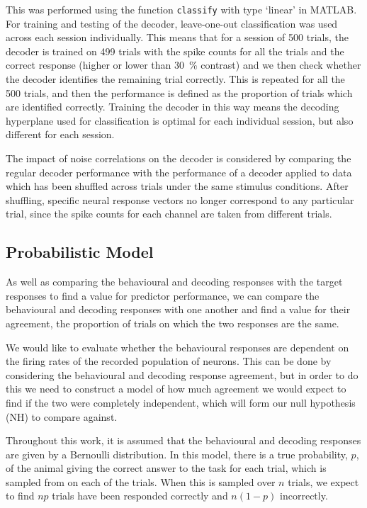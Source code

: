 This was performed using the function \texttt{classify} with type `linear' in MATLAB.
For training and testing of the decoder, leave-one-out classification was used across each session individually.
This means that for a session of 500 trials, the decoder is trained on 499 trials with the spike counts for all the trials and the correct response (higher or lower than \SI{30}{\percent} contrast) and we then check whether the decoder identifies the remaining trial correctly.
This is repeated for all the 500 trials, and then the performance is defined as the proportion of trials which are identified correctly.
Training the decoder in this way means the decoding hyperplane used for classification is optimal for each individual session, but also different for each session.

The impact of noise correlations on the decoder is considered by comparing the regular decoder performance with the performance of a decoder applied to data which has been shuffled across trials under the same stimulus conditions.
After shuffling, specific neural response vectors no longer correspond to any particular trial, since the spike counts for each channel are taken from different trials.

\subsection{Probabilistic Model}
\label{sec:dec-meth-prob}

As well as comparing the behavioural and decoding responses with the target responses to find a value for predictor performance, we can compare the behavioural and decoding responses with one another and find a value for their agreement, the proportion of trials on which the two responses are the same.

We would like to evaluate whether the behavioural responses are dependent on the firing rates of the recorded population of neurons.
This can be done by considering the behavioural and decoding response agreement, but in order to do this we need to construct a model of how much agreement we would expect to find if the two were completely independent, which will form our null hypothesis (NH) to compare against.

Throughout this work, it is assumed that the behavioural and decoding responses are given by a Bernoulli distribution.
In this model, there is a true probability, $p$, of the animal giving the correct answer to the task for each trial, which is sampled from on each of the trials.
When this is sampled over $n$ trials, we expect to find $np$ trials have been responded correctly and $n(1-p)$ incorrectly.


